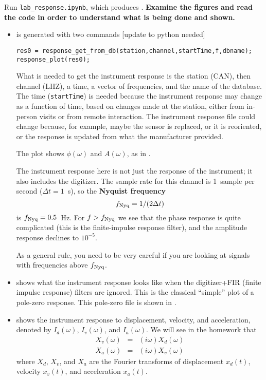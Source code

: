 \documentclass[11pt,titlepage,fleqn]{article}
\newcommand{\tfile}{{\tt lab\_response.ipynb}}
\begin{document}
Run \tfile, which produces . {\bf Examine the figures and read the code in order to understand what is being done and shown.}
%
\begin{itemize}
\item {} is generated with two commands [update to python needed]
%
\begin{verbatim}
res0 = response_get_from_db(station,channel,startTime,f,dbname);
response_plot(res0);
\end{verbatim}
%
What is needed to get the instrument response is the station (CAN), then channel (LHZ), a time, a vector of frequencies, and the name of the database. The time (\verb+startTime+) is needed because the instrument response may change as a function of time, based on changes made at the station, either from in-person visits or from remote interaction. The instrument response file could change because, for example, maybe the sensor is replaced, or it is reoriented, or the response is updated from what the manufacturer provided.

The plot shows $\phi(\omega)$ and $A(\omega)$, as in .

The instrument response here is not just the response of the instrument; it also includes the digitizer. The sample rate for this channel is 1~sample per second ($\Delta t = 1$~s), so the {\bf Nyquist frequency}
%
\begin{equation}
f_{\rm Nyq} = 1/(2\Delta t)
\end{equation}
%
is $f_{\rm Nyq} = 0.5$~Hz. For $f > f_{\rm Nyq}$ we see that the phase response is quite complicated (this is the finite-impulse response filter), and the amplitude response declines to $10^{-5}$.

As a general rule, you need to be very careful if you are looking at signals with frequencies above $f_{\rm Nyq}$.

\item {} shows what the instrument response looks like when the digitizer+FIR (finite impulse response) filters are ignored. This is the classical ``simple'' plot of a pole-zero response. This pole-zero file is shown in .


\item {} shows the instrument response to displacement, velocity, and acceleration, denoted by $I_d(\omega)$, $I_v(\omega)$, and $I_a(\omega)$. We will see in the homework that 
%
\begin{eqnarray*}
X_v(\omega) &=& (i\omega) X_d(\omega)
\\
X_a(\omega) &=& (i\omega) X_v(\omega)
\end{eqnarray*}
%
where $X_d$, $X_v$, and $X_a$ are the Fourier transforms of displacement $x_d(t)$, velocity $x_v(t)$, and acceleration $x_a(t)$.


\end{itemize}
\end{document}
